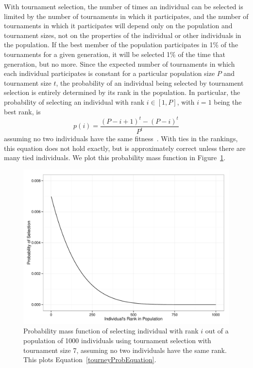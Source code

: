 \documentclass{sig-alternate}
\begin{document}
With tournament selection, the number of times an individual can be selected is limited by the number of tournaments in which it participates, and the number of tournaments in which it participates will depend only on the population and tournament sizes, not on the properties of the individual or other individuals in the population. If the best member of the population participates in 1\% of the tournaments for a given generation, it will be selected 1\% of the time that generation, but no more.
 Since the expected number of tournaments in which each individual participates is constant for a particular population size $P$ and tournament size $t$, the probability of an individual being selected by tournament selection is entirely determined by its rank in the population. In particular, the probability of selecting an individual with rank $i \in [1,P]$, with $i = 1$ being the best rank, is
\begin{equation}\label{tourneyProbEquation}
p(i) = \frac{(P-i+1)^t - (P-i)^t}{P^t}
\end{equation}
assuming no two individuals have the same fitness~\cite{350042, Blickle:1995:MAT:645514.658088}. With ties in the rankings, this equation does not hold exactly, but is approximately correct unless there are many tied individuals. We plot this probability mass function in Figure~\ref{fig:prob-selection-tourney-7}.

\begin{figure}[t] %
\centering
\includegraphics[width=\linewidth]{probSelectionTourney7.pdf}
\caption{Probability mass function of selecting individual with rank $i$ out of a population of 1000 individuals using tournament selection with tournament size 7, assuming no two individuals have the same rank. This plots Equation~\ref{tourneyProbEquation}.}
\label{fig:prob-selection-tourney-7}
\end{figure}
\end{document}
